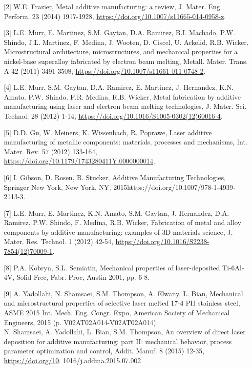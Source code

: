 \documentclass[10pt]{article}
\begin{document}
[2] W.E. Frazier, Metal additive manufacturing: a review, J. Mater. Eng. Perform. 23 (2014) 1917-1928, \href{https://doi.org/10.1007/s11665-014-0958-z}{https://doi.org/10.1007/s11665-014-0958-z}.

[3] L.E. Murr, E. Martinez, S.M. Gaytan, D.A. Ramirez, B.I. Machado, P.W. Shindo, J.L. Martinez, F. Medina, J. Wooten, D. Ciscel, U. Ackelid, R.B. Wicker, Microstructural architecture, microstructures, and mechanical properties for a nickel-base superalloy fabricated by electron beam melting, Metall. Mater. Trans. A 42 (2011) 3491-3508, \href{https://doi.org/10.1007/s11661-011-0748-2}{https://doi.org/10.1007/s11661-011-0748-2}.

[4] L.E. Murr, S.M. Gaytan, D.A. Ramirez, E. Martinez, J. Hernandez, K.N. Amato, P.W. Shindo, F.R. Medina, R.B. Wicker, Metal fabrication by additive manufacturing using laser and electron beam melting technologies, J. Mater. Sci. Technol. 28 (2012) 1-14, \href{https://doi.org/10.1016/S1005-0302(12)60016-4}{https://doi.org/10.1016/S1005-0302(12)60016-4}.

[5] D.D. Gu, W. Meiners, K. Wissenbach, R. Poprawe, Laser additive manufacturing of metallic components: materials, processes and mechanisms, Int. Mater. Rev. 57 (2012) 133-164, \href{https://doi.org/10.1179/1743280411Y.0000000014}{https://doi.org/10.1179/1743280411Y.0000000014}.

[6] I. Gibson, D. Rosen, B. Stucker, Additive Manufacturing Technologies, Springer New York, New York, NY, 2015https://doi.org/10.1007/978-1-4939-2113-3.

[7] L.E. Murr, E. Martinez, K.N. Amato, S.M. Gaytan, J. Hernandez, D.A. Ramirez, P.W. Shindo, F. Medina, R.B. Wicker, Fabrication of metal and alloy components by additive manufacturing: examples of 3D materials science, J. Mater. Res. Technol. 1 (2012) 42-54, \href{https://doi.org/10.1016/S2238-7854(12)70009-1}{https://doi.org/10.1016/S2238-7854(12)70009-1}.

[8] P.A. Kobryn, S.L. Semiatin, Mechanical properties of laser-deposited Ti-6Al-4V, Solid Free, Fabr. Proc, Austin 2001, pp. 6-8.

[9] A. Yadollahi, N. Shamsaei, S.M. Thompson, A. Elwany, L. Bian, Mechanical and microstructural properties of selective laser melted 17-4 PH stainless steel, ASME 2015 Int. Mech. Eng. Congr. Expo, American Society of Mechanical Engineers, 2015 (p. V02AT02A014-V02AT02A014).\\
[10] N. Shamsaei, A. Yadollahi, L. Bian, S.M. Thompson, An overview of direct laser deposition for additive manufacturing; part II: mechanical behavior, process parameter optimization and control, Addit. Manuf. 8 (2015) 12-35, \href{https://doi.org/10}{https://doi.org/10}. 1016/j.addma.2015.07.002
\end{document}
